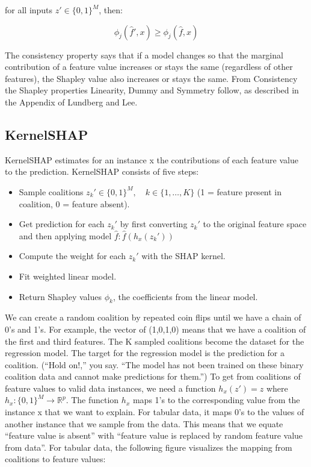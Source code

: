 \documentclass[
  10pt,
]{scrbook}
\providecommand{\tightlist}{%
  \setlength{\itemsep}{0pt}\setlength{\parskip}{0pt}}
\begin{document}
for all inputs \(z'\in\{0,1\}^M\), then:

\[\phi_j(\hat{f}',x)\geq\phi_j(\hat{f},x)\]

The consistency property says that if a model changes so that the marginal contribution of a feature value increases or stays the same (regardless of other features), the Shapley value also increases or stays the same.
From Consistency the Shapley properties Linearity, Dummy and Symmetry follow, as described in the Appendix of Lundberg and Lee.

\hypertarget{kernelshap}{%
\subsection{KernelSHAP}\label{kernelshap}}

KernelSHAP estimates for an instance x the contributions of each feature value to the prediction.
KernelSHAP consists of five steps:

\begin{itemize}
\tightlist
\item
  Sample coalitions \(z_k'\in\{0,1\}^M,\quad{}k\in\{1,\ldots,K\}\) (1 = feature present in coalition, 0 = feature absent).
\item
  Get prediction for each \(z_k'\) by first converting \(z_k'\) to the original feature space and then applying model \(\hat{f}: \hat{f}(h_x(z_k'))\)
\item
  Compute the weight for each \(z_k'\) with the SHAP kernel.
\item
  Fit weighted linear model.
\item
  Return Shapley values \(\phi_k\), the coefficients from the linear model.
\end{itemize}

We can create a random coalition by repeated coin flips until we have a chain of 0's and 1's.
For example, the vector of (1,0,1,0) means that we have a coalition of the first and third features.
The K sampled coalitions become the dataset for the regression model.
The target for the regression model is the prediction for a coalition.
(``Hold on!,'' you say. ``The model has not been trained on these binary coalition data and cannot make predictions for them.'')
To get from coalitions of feature values to valid data instances, we need a function \(h_x(z')=z\) where \(h_x:\{0,1\}^M\rightarrow\mathbb{R}^p\).
The function \(h_x\) maps 1's to the corresponding value from the instance x that we want to explain.
For tabular data, it maps 0's to the values of another instance that we sample from the data.
This means that we equate ``feature value is absent'' with ``feature value is replaced by random feature value from data''.
For tabular data, the following figure visualizes the mapping from coalitions to feature values:
\end{document}

